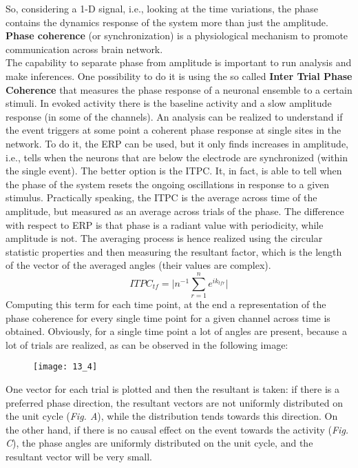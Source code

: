 So, considering a 1-D signal, i.e., looking at the time variations, the phase contains the dynamics response of the system more than just the amplitude.
\textbf{Phase coherence} (or synchronization) is a physiological mechanism to promote communication across brain network.\\
The capability to separate phase from amplitude is important to run analysis and make inferences.
One possibility to do it is using the so called \textbf{Inter Trial Phase Coherence} that measures the phase response of a neuronal ensemble to a certain stimuli.
In evoked activity there is the baseline activity and a slow amplitude response (in some of the channels). 
An analysis can be realized to understand if the event triggers at some point a coherent phase response at single sites in the network. 
To do it, the ERP can be used, but it only finds increases in amplitude, i.e., tells when the neurons that are below the electrode are synchronized (within the single event). The better option is the ITPC. It, in fact, is able to tell when the phase of the system resets the ongoing oscillations in response to a given stimulus. 
Practically speaking, the ITPC is the average across time of the amplitude, but measured as an average across trials of the phase. 
The difference with respect to ERP is that phase is a radiant value with periodicity, while amplitude is not. The averaging process is hence realized using the circular statistic properties and then measuring the resultant factor, which is the length of the vector of the averaged angles (their values are complex).
\begin{equation*}
    ITPC_{tf}=\biggl|n^{-1}\sum_{r=1}^ne^{ik_{tfr}}\biggr|
\end{equation*}
Computing this term for each time point, at the end a representation of the phase coherence for every single time point for a given channel across time is obtained.
Obviously, for a single time point a lot of angles are present, because a lot of trials are realized, as can be observed in the following image:
\begin{figure}[H]
    \centering
    \texttt{[image: 13\_4]}
\end{figure}
One vector for each trial is plotted and then the resultant is taken: if there is a preferred phase direction, the resultant vectors are not uniformly distributed on the unit cycle (\textit{Fig. A}), while the distribution tends towards this direction. On the other hand, if there is no causal effect on the event towards the activity (\textit{Fig. C}), the phase angles are uniformly distributed on the unit cycle, and the resultant vector will be very small.

